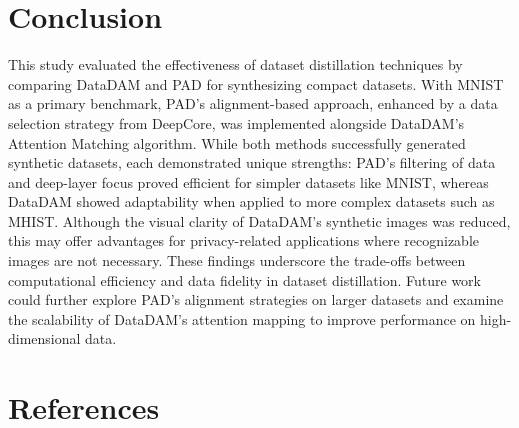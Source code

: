 \documentclass[conference, compsoc]{IEEEtran}
\begin{document}
	\section{Conclusion}
	
	This study evaluated the effectiveness of dataset distillation techniques by comparing DataDAM and PAD for synthesizing compact datasets. With MNIST as a primary benchmark, PAD’s alignment-based approach, enhanced by a data selection strategy from DeepCore, was implemented alongside DataDAM’s Attention Matching algorithm. While both methods successfully generated synthetic datasets, each demonstrated unique strengths: PAD’s filtering of data and deep-layer focus proved efficient for simpler datasets like MNIST, whereas DataDAM showed adaptability when applied to more complex datasets such as MHIST. Although the visual clarity of DataDAM’s synthetic images was reduced, this may offer advantages for privacy-related applications where recognizable images are not necessary. These findings underscore the trade-offs between computational efficiency and data fidelity in dataset distillation. Future work could further explore PAD’s alignment strategies on larger datasets and examine the scalability of DataDAM’s attention mapping to improve performance on high-dimensional data.
	
	\section*{References}
	\nocite{*}
	\printbibliography[heading=none]
	
	
	
\end{document}

